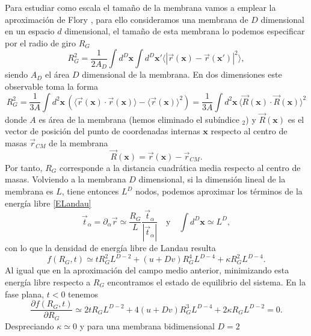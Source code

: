 Para estudiar como escala el tamaño de la membrana vamos a emplear la
aproximación de Flory \cite{Gennes:Scaling}, para ello consideramos una
membrana de $D$ dimensional en un espacio 
$d$ dimensional, el tamaño de esta membrana lo podemos especificar por el
radio de giro $R_G$
\begin{equation*}
R_G^2=\frac{1}{2A_D}\int d^D\mathbf{x}\int d^D\mathbf{x}' \langle |
\vec{r}(\mathbf{x})-\vec{r}(\mathbf{x}')|^2\rangle, 
\end{equation*}
siendo $A_D$ el área $D$ dimensional de la membrana. En dos dimensiones este
observable toma la forma
\begin{equation*}
R_G^2=\frac{1}{3A}\int d^2\mathbf{x}\, (\langle
\vec{r}(\mathbf{x})\cdot\vec{r}(\mathbf{x})\rangle-\langle
\vec{r}(\mathbf{x})\rangle^2)=\frac{1}{3A}\int d^2\mathbf{x}\, \langle
\vec{R}(\mathbf{x})\cdot\vec{R}(\mathbf{x})\rangle^2
\end{equation*} 
donde $A$ es área de la membrana (hemos eliminado el subíndice $_2$) y
$\vec{R}(\mathbf{x})$ es el vector de posición del punto de coordenadas
internas $\mathbf{x}$ respecto al centro de masas $\vec{r}_{CM}$ de la
membrana
\begin{equation*}
\vec{R}(\mathbf{x})=\vec{r}(\mathbf{x})-\vec{r}_{CM}.
\end{equation*}
Por tanto, $R_G$ corresponde a la distancia cuadrática media respecto al
centro de masas. Volviendo a la membrana $D$ dimensional, si la dimensión
lineal de la membrana es $L$, tiene entonces $L^D$ nodos, podemos
aproximar los términos \cite{David:normal,Gomper:triangulated} de la energía libre \eqref{ELandau}  
\begin{equation*}
\vec{t}_{\alpha}=\partial_{\alpha} \vec{r}\simeq \frac{R_G}{L}
\frac{\vec{t}_{\alpha}}{|\vec{t}_{\alpha}|}\quad \text{y}\quad \int
d^D\mathbf{x}\simeq L^D,
\end{equation*}
con lo que la densidad de energía libre de Landau resulta
\begin{equation*}
f(R_G,t)\simeq t R_G^2 L^{D-2}+(u+Dv) R_G^4 L^{D-4}+\kappa R_G^2 L^{D-4}.
\end{equation*}
Al igual que en la aproximación del campo medio anterior, minimizando esta
energía libre respecto a $R_G$ encontramos el estado de equilibrio del sistema. En la fase
plana, $t<0$ tenemos
\begin{equation*}
\frac{\partial f(R_G,t)}{\partial R_G}\simeq 2t R_G L^{D-2}+4(u+Dv) R_G^3
L^{D-4}+2 \kappa R_G L^{D-2}=0.
\end{equation*}
Despreciando $\kappa\simeq 0$ y para una membrana bidimensional $D=2$
